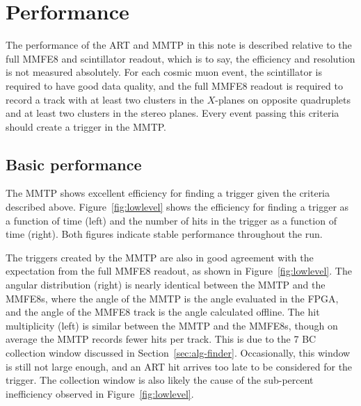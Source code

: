 \section{Performance}
\label{sec:perf}

The performance of the ART and MMTP in this note is described relative to the full MMFE8 and scintillator readout, which is to say, the efficiency and resolution is not measured absolutely. For each cosmic muon event, the scintillator is required to have good data quality, and the full MMFE8 readout is required to record a track with at least two clusters in the $X$-planes on opposite quadruplets and at least two clusters in the stereo planes. Every event passing this criteria should create a trigger in the MMTP.

\subsection{Basic performance}
\label{sec:perf-basic}

The MMTP shows excellent efficiency for finding a trigger given the criteria described above. Figure~\ref{fig:lowlevel} shows the efficiency for finding a trigger as a function of time (left) and the number of hits in the trigger as a function of time (right). Both figures indicate stable performance throughout the run.

The triggers created by the MMTP are also in good agreement with the expectation from the full MMFE8 readout, as shown in Figure~\ref{fig:lowlevel}. The angular distribution (right) is nearly identical between the MMTP and the MMFE8s, where the angle of the MMTP is the angle evaluated in the FPGA, and the angle of the MMFE8 track is the angle calculated offline. The hit multiplicity (left) is similar between the MMTP and the MMFE8s, though on average the MMTP records fewer hits per track. This is due to the 7 BC collection window discussed in Section~\ref{sec:alg-finder}. Occasionally, this window is still not large enough, and an ART hit arrives too late to be considered for the trigger. The collection window is also likely the cause of the sub-percent inefficiency observed in Figure~\ref{fig:lowlevel}.

